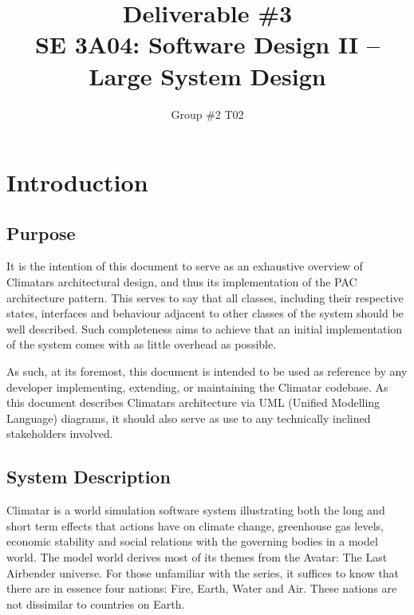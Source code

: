 \documentclass[]{article}
\title{Deliverable \#3 \\ SE 3A04: Software Design II -- Large System Design}
\author{Group \#2 T02}
\date{}
\begin{document}
\maketitle	

\section{Introduction}
\label{sec:introduction}

\subsection{Purpose}
\label{sub:purpose}
It is the intention of this document to serve as an exhaustive overview of Climatars architectural design, and thus its implementation of the PAC architecture pattern. This serves to say that all classes, including their respective states, interfaces and behaviour adjacent to other classes of the system should be well described. Such completeness aims to achieve that an initial implementation of the system comes with as little overhead as possible.

\vspace{5mm}
\noindent
As such, at its foremost, this document is intended to be used as
reference by any developer implementing, extending, or maintaining the
Climatar codebase. As this document describes Climatars architecture
via UML (Unified Modelling Language) diagrams, it should also serve as
use to any technically inclined stakeholders involved.


\subsection{System Description}
\label{sub:system_description}
Climatar is a world simulation software system illustrating both the
long and short term effects that actions have on climate change,
greenhouse gas levels, economic stability and social relations with
the governing bodies in a model world. The model world derives most of
its themes from the Avatar: The Last Airbender universe. For those
unfamiliar with the series, it suffices to know that there are in
essence four nations: Fire, Earth, Water and Air. These nations are
not dissimilar to countries on Earth. 
\end{document}
